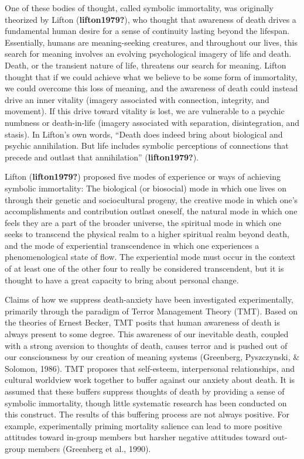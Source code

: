 \documentclass[
  man]{apa6}
\begin{document}
One of these bodies of thought, called symbolic immortality, was
originally theorized by Lifton (\textbf{lifton1979?}), who thought that
awareness of death drives a fundamental human desire for a sense of
continuity lasting beyond the lifespan. Essentially, humans are
meaning-seeking creatures, and throughout our lives, this search for
meaning involves an evolving psychological imagery of life and death.
Death, or the transient nature of life, threatens our search for
meaning. Lifton thought that if we could achieve what we believe to be
some form of immortality, we could overcome this loss of meaning, and
the awareness of death could instead drive an inner vitality (imagery
associated with connection, integrity, and movement). If this drive
toward vitality is lost, we are vulnerable to a psychic numbness or
death-in-life (imagery associated with separation, disintegration, and
stasis). In Lifton's own words, ``Death does indeed bring about
biological and psychic annihilation. But life includes symbolic
perceptions of connections that precede and outlast that annihilation''
(\textbf{lifton1979?}).

Lifton (\textbf{lifton1979?}) proposed five modes of experience or ways of
achieving symbolic immortality: The biological (or biosocial) mode in
which one lives on through their genetic and sociocultural progeny, the
creative mode in which one's accomplishments and contribution outlast
oneself, the natural mode in which one feels they are a part of the
broader universe, the spiritual mode in which one seeks to transcend the
physical realm to a higher spiritual realm beyond death, and the mode of
experiential transcendence in which one experiences a phenomenological
state of flow. The experiential mode must occur in the context of at
least one of the other four to really be considered transcendent, but it
is thought to have a great capacity to bring about personal change.

Claims of how we suppress death-anxiety have been investigated
experimentally, primarily through the paradigm of Terror Management
Theory (TMT). Based on the theories of Ernest Becker, TMT posits that
human awareness of death is always present to some degree. This
awareness of our inevitable death, coupled with a strong aversion to
thoughts of death, causes terror and is pushed out of our consciousness
by our creation of meaning systems (Greenberg, Pyszczynski, \& Solomon, 1986). TMT proposes that
self-esteem, interpersonal relationships, and cultural worldview work
together to buffer against our anxiety about death. It is assumed that
these buffers suppress thoughts of death by providing a sense of
symbolic immortality, though little systematic research has been
conducted on this construct. The results of this buffering process are
not always positive. For example, experimentally priming mortality
salience can lead to more positive attitudes toward in-group members but
harsher negative attitudes toward out-group members (Greenberg et al., 1990).
\end{document}
